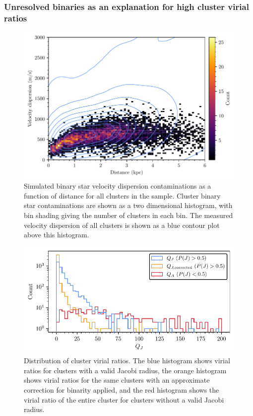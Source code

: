 \subsubsection{Unresolved binaries as an explanation for high cluster virial ratios}

\begin{figure}[t]
    \centering
    \includegraphics[width=\textwidth]{fig/c4/dispersion_binaries.pdf}
    \caption[Simulated binary star velocity dispersion contaminations as a function of distance for all clusters in the sample]{Simulated binary star velocity dispersion contaminations as a function of distance for all clusters in the sample. Cluster binary star contaminations are shown as a two dimensional histogram, with bin shading giving the number of clusters in each bin. The measured velocity dispersion of all clusters is shown as a blue contour plot above this histogram.}
    \label{fig:dynamics:velocities:binary_contamination}
\end{figure}

\begin{figure}[t]
    \centering
    \includegraphics[width=\textwidth]{fig/c4/results_q_distribution.pdf}
    \caption[Distribution of cluster virial ratios]{Distribution of cluster virial ratios. The blue histogram shows virial ratios for clusters with a valid Jacobi radius, the orange histogram shows virial ratios for the same clusters with an approximate correction for binarity applied, and the red histogram shows the virial ratio of the entire cluster for clusters without a valid Jacobi radius.}
    \label{fig:dynamics:results:virial_ratio_distribution}
\end{figure}

